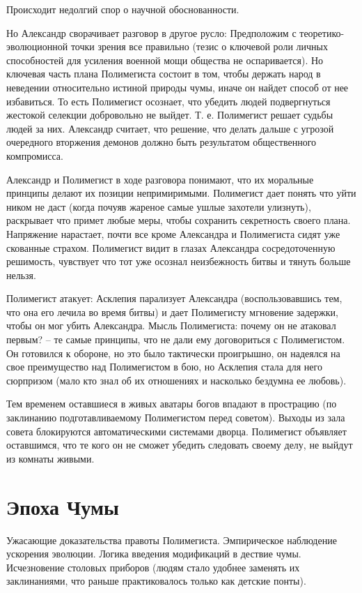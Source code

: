 \documentclass[12pt,a4paper]{article}
\begin{document}
Происходит недолгий спор о научной обоснованности.

Но Александр сворачивает разговор в другое русло: Предположим с теоретико-эволюционной точки зрения все правильно (тезис о ключевой роли личных способностей для усиления военной мощи общества не оспаривается). Но ключевая часть плана Полимегиста состоит в том, чтобы держать народ в неведении относительно истиной природы чумы, иначе он найдет способ от нее избавиться. То есть Полимегист осознает, что убедить людей подвергнуться жестокой селекции добровольно не выйдет. Т. е. Полимегист решает судьбы людей за них. Александр считает, что решение, что делать дальше с угрозой очередного вторжения демонов должно быть результатом общественного компромисса.

Александр и Полимегист в ходе разговора понимают, что их моральные принципы делают их позиции непримиримыми. Полимегист дает понять что уйти ником не даст (когда почуяв жареное самые ушлые захотели улизнуть), раскрывает что примет любые меры, чтобы сохранить секретность своего плана. Напряжение нарастает, почти все кроме Александра и Полимегиста сидят уже скованные страхом. Полимегист видит в глазах Александра сосредоточенную решимость, чувствует что тот уже осознал неизбежность битвы и тянуть больше нельзя.

Полимегист атакует: Асклепия парализует Александра (воспользовавшись тем, что она его лечила во время битвы) и дает Полимегисту мгновение задержки, чтобы он мог убить Александра. Мысль Полимегиста: почему он не атаковал первым? -- те самые принципы, что не дали ему договориться с Полимегистом. Он готовился к обороне, но это было тактически проигрышно, он надеялся на свое преимущество над Полимегистом в бою, но Асклепия стала для него сюрпризом (мало кто знал об их отношениях и насколько бездумна ее любовь).

Тем временем оставшиеся в живых аватары богов впадают в прострацию (по заклинанию подготавливаемому Полимегистом перед советом). Выходы из зала совета блокируются автоматическими системами дворца. Полимегист объявляет оставшимся, что те кого он не сможет убедить следовать своему делу, не выйдут из комнаты живыми.



\section*{Эпоха Чумы}
Ужасающие доказательства правоты Полимегиста.
Эмпирическое наблюдение ускорения эволюции.
Логика введения модификаций в дествие чумы.
Исчезновение столовых приборов (людям стало удобнее заменять их заклинаниями, что раньше практиковалось только как детские понты).
\end{document}
